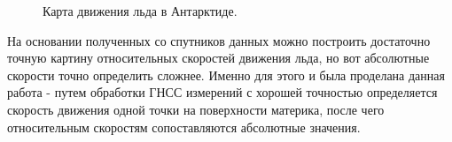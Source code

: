 \documentclass[a4paper,12pt]{report}
\begin{document}
\begin{figure}[H]
\caption{Карта движения льда в Антарктиде.}
\end{figure}

На основании полученных со спутников данных можно построить достаточно точную картину относительных скоростей движения льда, но вот абсолютные 
скорости точно определить сложнее. Именно для этого и была проделана данная работа - путем обработки ГНСС измерений с хорошей точностью 
определяется скорость движения одной точки на поверхности материка, после чего относительным скоростям сопоставляются абсолютные значения.
\end{document}
